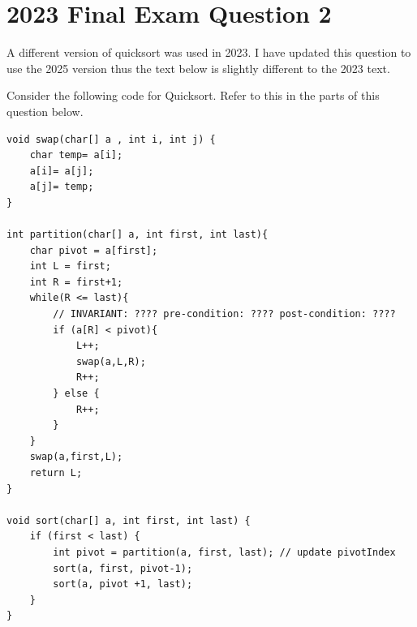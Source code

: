 \documentclass[twoside=false,DIV=14]{scrartcl}
\begin{document}
\section{2023 Final Exam Question 2}
\begin{note}
A different version of quicksort was used in 2023.  I have updated this question to use the 2025 version thus the text below is slightly different to the 2023 text.
\end{note}
Consider the following code for Quicksort. Refer to this in the parts of this question below.
{\small\begin{lstlisting}
void swap(char[] a , int i, int j) {
    char temp= a[i];
    a[i]= a[j];
    a[j]= temp;
}

int partition(char[] a, int first, int last){
    char pivot = a[first];
    int L = first;
    int R = first+1;
    while(R <= last){
        // INVARIANT: ???? pre-condition: ???? post-condition: ????
        if (a[R] < pivot){
            L++;
            swap(a,L,R);
            R++;
        } else {
            R++;
        }
    }
    swap(a,first,L);
    return L;
}

void sort(char[] a, int first, int last) {
    if (first < last) {
        int pivot = partition(a, first, last); // update pivotIndex
        sort(a, first, pivot-1);
        sort(a, pivot +1, last);
    }
}
\end{lstlisting}}
\end{document}
